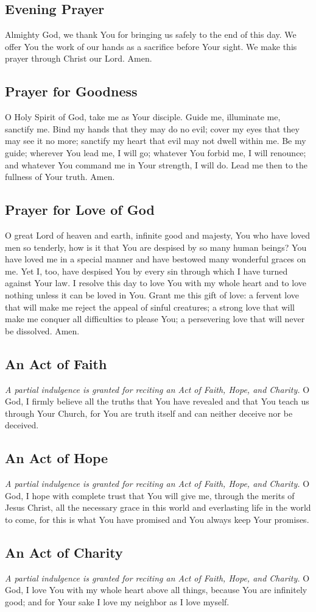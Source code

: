 \documentclass[12pt]{article}
\newcommand{\prayertitle}[1]{\subsection{#1}}
\newcommand{\indulgencedprayertitle}[1]{\prayertitle{#1 \protect\kreuz}}
\newcommand{\note}[1]{{\small{\textsl{#1}}}\newline}
\begin{document}
\prayertitle{Evening Prayer}
Almighty God, we thank You for bringing us safely to the end of this day.
We offer You the work of our hands as a sacrifice before Your sight.
We make this prayer through Christ our Lord.
Amen.

\prayertitle{Prayer for Goodness}
O Holy Spirit of God, take me as Your disciple.
Guide me, illuminate me, sanctify me.
Bind my hands that they may do no evil;
cover my eyes that they may see it no more;
sanctify my heart that evil may not dwell within me.
Be my guide;
wherever You lead me, I will go;
whatever You forbid me, I will renounce;
and whatever You command me in Your strength, I will do.
Lead me then to the fullness of Your truth.
Amen.

\prayertitle{Prayer for Love of God}
O great Lord of heaven and earth, infinite good and majesty, You who have loved men so tenderly, how is it that You are despised by so many human beings?
You have loved me in a special manner and have bestowed many wonderful graces on me.
Yet I, too, have despised You by every sin through which I have turned against Your law.
I resolve this day to love You with my whole heart and to love nothing unless it can be loved in You.
Grant me this gift of love:
a fervent love that will make me reject the appeal of sinful creatures;
a strong love that will make me conquer all difficulties to please You;
a persevering love that will never be dissolved.
Amen.

\indulgencedprayertitle{An Act of Faith}
\note{A partial indulgence is granted for reciting an Act of Faith, Hope, and Charity.}
O God,
I firmly believe all the truths that You have revealed and that You teach us through Your Church, for You are truth itself and can neither deceive nor be deceived.

\indulgencedprayertitle{An Act of Hope}
\note{A partial indulgence is granted for reciting an Act of Faith, Hope, and Charity.}
O God,
I hope with complete trust that You will give me, through the merits of Jesus Christ, all the necessary grace in this world and everlasting life in the world to come, for this is what You have promised and You always keep Your promises.

\indulgencedprayertitle{An Act of Charity}
\note{A partial indulgence is granted for reciting an Act of Faith, Hope, and Charity.}
O God,
I love You with my whole heart above all things, because You are infinitely good; and for Your sake I love my neighbor as I love myself.
\end{document}
